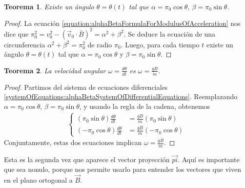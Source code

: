 \documentclass{article}
\newtheorem{theorem}{Teorema}
\begin{document}
  \begin{theorem}
    \label{theorem:alphaBetaDescribeCircularMotion}
    Existe un ángulo \(\theta = \theta(t)\) tal que \(\alpha = \pi_0 \cos \theta\), \(\beta = \pi_0 \sin \theta\).
  \end{theorem}
  \begin{proof}
    La ecuación \ref{equation:alphaBetaFormulaForModulusOfAcceleration} nos dice que \(\pi_0^2 = v_0^2 - (\vec{v}_0 \cdot \bar{B})^2 = \alpha^2 + \beta^2\).
    Se deduce la ecuación de una circunferencia \(\alpha^2 + \beta^2 = \pi_0^2\) de radio \(\pi_0\).
    Luego, para cada tiempo \(t\) existe un ángulo \(\theta = \theta(t)\) tal que \(\alpha = \pi_0 \cos \theta\) y \(\beta = \pi_0 \sin \theta\).
  \end{proof}

  \begin{theorem}
    \label{theorem:thetaDifferentialEquation}
    La velocidad angular \(\omega = \frac{d \theta}{d t}\) es \(\omega = \frac{q B}{m}\).
  \end{theorem}
  \begin{proof}
    Partimos del sistema de ecuaciones diferenciales \eqref{systemOfEquations:alphaBetaSystemOfDifferentialEquations}.
    Reemplazando \(\alpha = \pi_0 \cos \theta\), \(\beta = \pi_0 \sin \theta\), y usando la regla de la cadena, obtenemos
    \begin{align}
      \left\{
        \begin{aligned}
          (\pi_0 \sin \theta) \frac{d \theta}{d t}
          &=
          \frac{q B}{m} (\pi_0 \sin \theta)
          \\
          (- \pi_0 \cos \theta) \frac{d \theta}{d t}
          &=
          \frac{q B}{m} (- \pi_0 \cos \theta)
        \end{aligned}
      \right.
    \end{align}
    Conjuntamente, estas dos ecuaciones implican \(\omega = \frac{q B}{m}\).
  \end{proof}

  Esta es la segunda vez que aparece el vector proyección \(\vec{pi}\).
  Aquí es importante que sea nonulo, porque nos permite usarlo para entender los vectores que viven en el plano ortogonal a \(\vec{B}\).
\end{document}

